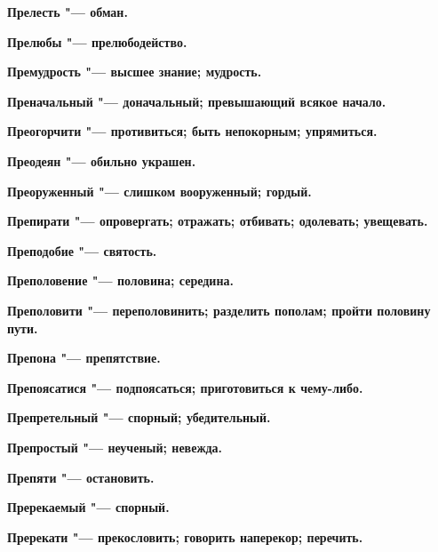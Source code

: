 \begin{multicols}{2}
\bfseries Прелесть\normalfont{} "--- обман. 




\bfseries Прелюбы\normalfont{} "--- прелюбодейство. 




\bfseries Премудрость\normalfont{} "--- высшее знание; мудрость. 




\bfseries Преначальный\normalfont{} "--- доначальный; превышающий всякое начало. 




\bfseries Преогорчити\normalfont{} "--- противиться; быть непокорным; упрямиться. 




\bfseries Преодеян\normalfont{} "--- обильно украшен. 




\bfseries Преоруженный\normalfont{} "--- слишком вооруженный; гордый. 




\bfseries Препирати\normalfont{} "--- опровергать; отражать; отбивать; одолевать; увещевать. 




\bfseries Преподобие\normalfont{} "--- святость. 




\bfseries Преполовение\normalfont{} "--- половина; середина. 




\bfseries Преполовити\normalfont{} "--- переполовинить; разделить пополам; пройти половину пути. 




\bfseries Препона\normalfont{} "--- препятствие. 




\bfseries Препоясатися\normalfont{} "--- подпоясаться; приготовиться к чему-либо. 




\bfseries Препретельный\normalfont{} "--- спорный; убедительный. 




\bfseries Препростый\normalfont{} "--- неученый; невежда. 




\bfseries Препяти\normalfont{} "--- остановить. 




\bfseries Пререкаемый\normalfont{} "--- спорный. 




\bfseries Пререкати\normalfont{} "--- прекословить; говорить наперекор; перечить. 





\end{multicols}

